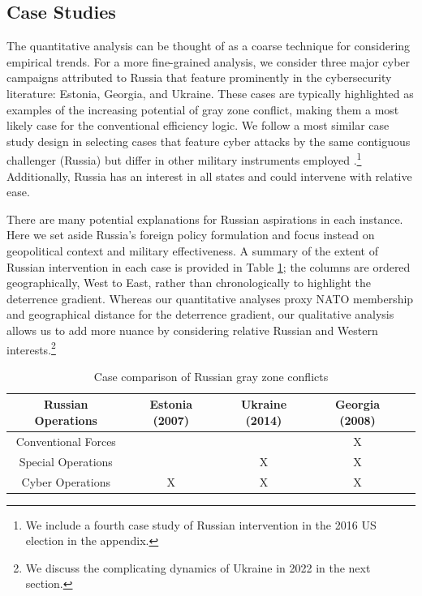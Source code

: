 \documentclass[11pt,letterpaper,pdftex,dvipsnames,table]{article}
\begin{document}
\subsection{Case Studies}
The quantitative analysis can be thought of as a coarse technique for considering empirical trends. For a more fine-grained analysis, we consider three major cyber campaigns attributed to Russia that feature prominently in the cybersecurity literature: Estonia, Georgia, and Ukraine. These cases are typically highlighted as examples of the increasing potential of gray zone conflict, making them a most likely case for the conventional efficiency logic. We follow a most similar case study design in selecting cases that feature cyber attacks by the same contiguous challenger (Russia) but differ in other military instruments employed \citep{bennett_casestudymethods_2007}.\footnote{We include a fourth case study of Russian intervention in the 2016 US election in the appendix.} Additionally, Russia has an interest in all states and could intervene with relative ease. 

There are many potential explanations for Russian aspirations in each instance. Here we set aside Russia's foreign policy formulation and focus instead on geopolitical context and military effectiveness. A summary of the extent of Russian intervention in each case is provided in Table \ref{table:russia}; the columns are ordered geographically, West to East, rather than chronologically to highlight the deterrence gradient. Whereas our quantitative analyses proxy NATO membership and geographical distance for the deterrence gradient, our qualitative analysis allows us to add more nuance by considering relative Russian and Western interests.\footnote{We discuss the complicating dynamics of Ukraine in 2022 in the next section.}
    
	\begin{table}[h]
		\centering
		\begin{tabular}{|c||c|c|c|c|}
		    \hline
            \textbf{Russian Operations} & Estonia (2007) & Ukraine (2014) & Georgia (2008) \\
			\hline
            Conventional Forces  &  &  &  X  \\
			\hline
            Special Operations  &  & X & X \\
			\hline
			Cyber Operations & X & X & X \\
			\hline
	    \end{tabular}
        \caption{Case comparison of Russian gray zone conflicts}
		\label{table:russia}
	\end{table}
\end{document}
